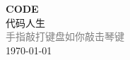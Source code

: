 \vspace*{\fill}
\begin{center}
    \textcolor{orange!50}{\Huge\textbf{CODE}} \\[1em]
    \textcolor{orange!60!pink}{\Large 代码人生} \\[2em]
    \textcolor{gray}{\large 手指敲打键盘如你敲击琴键} \\[1em]
    \today
\end{center}
\vspace*{\fill}
\clearpage


\clearpage

\clearpage


